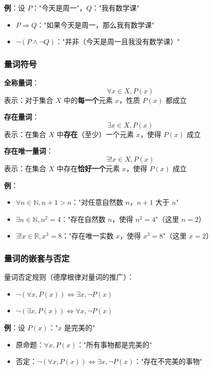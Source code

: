 \documentclass[12pt,a4paper,UTF8]{ctexart}
\begin{document}
\textbf{例}：设 $P$："今天是周一"，$Q$："我有数学课"
\begin{itemize}
    \item $P \Rightarrow Q$："如果今天是周一，那么我有数学课"
    \item $\neg (P \land \neg Q)$："并非（今天是周一且我没有数学课）"
\end{itemize}

\subsubsection{量词符号}

\textbf{全称量词}：
$$\forall x \in X, P(x)$$
表示：对于集合 $X$ 中的\textbf{每一个}元素 $x$，性质 $P(x)$ 都成立

\textbf{存在量词}：
$$\exists x \in X, P(x)$$
表示：在集合 $X$ 中\textbf{存在}（至少）一个元素 $x$，使得 $P(x)$ 成立

\textbf{存在唯一量词}：
$$\exists! x \in X, P(x)$$
表示：在集合 $X$ 中存在\textbf{恰好一个}元素 $x$，使得 $P(x)$ 成立

\textbf{例}：
\begin{itemize}
    \item $\forall n \in \mathbb{N}, n+1 > n$："对任意自然数 $n$，$n+1$ 大于 $n$"
    \item $\exists n \in \mathbb{N}, n^2 = 4$："存在自然数 $n$，使得 $n^2 = 4$"（这里 $n=2$）
    \item $\exists! x \in \mathbb{R}, x^3 = 8$："存在唯一实数 $x$，使得 $x^3 = 8$"（这里 $x=2$）
\end{itemize}

\subsubsection{量词的嵌套与否定}

量词否定规则（德摩根律对量词的推广）：
\begin{itemize}
    \item $\neg(\forall x, P(x)) \Leftrightarrow \exists x, \neg P(x)$
    \item $\neg(\exists x, P(x)) \Leftrightarrow \forall x, \neg P(x)$
\end{itemize}

\textbf{例}：设 $P(x)$："$x$ 是完美的"
\begin{itemize}
    \item 原命题：$\forall x, P(x)$："所有事物都是完美的"
    \item 否定：$\neg(\forall x, P(x)) \Leftrightarrow \exists x, \neg P(x)$："存在不完美的事物"
\end{itemize}
\end{document}
